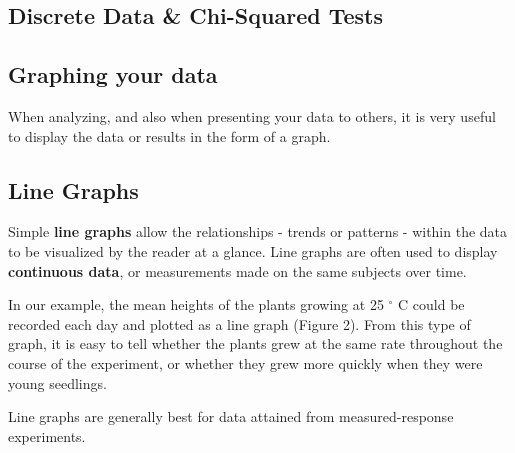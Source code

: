 \documentclass[
]{book}
\begin{document}
\hypertarget{discrete-data-chi-squared-tests}{%
\subsection*{Discrete Data \& Chi-Squared Tests}\label{discrete-data-chi-squared-tests}}

\hypertarget{graphing-your-data}{%
\subsection*{Graphing your data}\label{graphing-your-data}}

When analyzing, and also when presenting your data to others, it is very useful to display the data or results in the form of a graph.

\hypertarget{line-graphs}{%
\subsection*{Line Graphs}\label{line-graphs}}

Simple \textbf{line graphs} allow the relationships - trends or patterns - within the data to be visualized by the reader at a glance. Line graphs are often used to display \textbf{continuous data}, or measurements made on the same subjects over time.

In our example, the mean heights of the plants growing at 25 \(^\circ\) C could be recorded each day and plotted as a line graph (Figure 2). From this type of graph, it is easy to tell whether the plants grew at the same rate throughout the course of the experiment, or whether they grew more quickly when they were young seedlings.

Line graphs are generally best for data attained from measured-response experiments.
\end{document}
